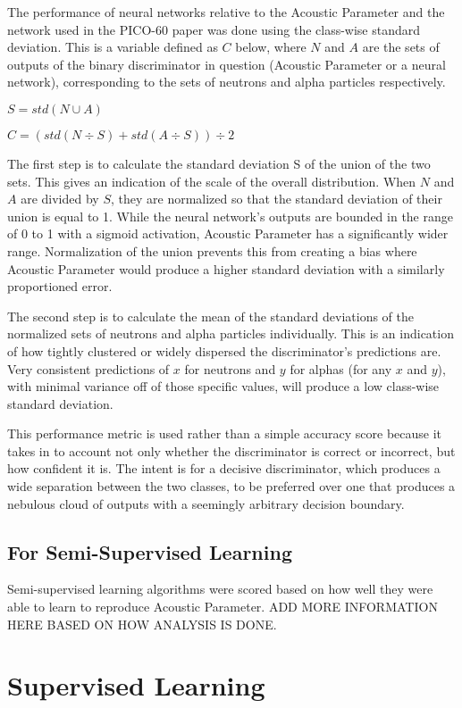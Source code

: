 \documentclass[10pt]{article}
\begin{document}
The performance of neural networks relative to the Acoustic Parameter and the network used in the PICO-60 paper was done using the class-wise standard deviation. This is a variable defined as $C$ below, where $N$ and $A$ are the sets of outputs of the binary discriminator in question (Acoustic Parameter or a neural network), corresponding to the sets of neutrons and alpha particles respectively.

$S=std(N \cup A)$

$C=(std(N \div S) + std(A \div S)) \div 2$

The first step is to calculate the standard deviation S of the union of the two sets. This gives an indication of the scale of the overall distribution. When $N$ and $A$ are divided by $S$, they are normalized so that the standard deviation of their union is equal to 1. While the neural network’s outputs are bounded in the range of 0 to 1 with a sigmoid activation, Acoustic Parameter has a significantly wider range. Normalization of the union prevents this from creating a bias where Acoustic Parameter would produce a higher standard deviation with a similarly proportioned error.

The second step is to calculate the mean of the standard deviations of the normalized sets of neutrons and alpha particles individually. This is an indication of how tightly clustered or widely dispersed the discriminator’s predictions are. Very consistent predictions of $x$ for neutrons and $y$ for alphas (for any $x$ and $y$), with minimal variance off of those specific values, will produce a low class-wise standard deviation.

This performance metric is used rather than a simple accuracy score because it takes in to account not only whether the discriminator is correct or incorrect, but how confident it is. The intent is for a decisive discriminator, which produces a wide separation between the two classes, to be preferred over one that produces a nebulous cloud of outputs with a seemingly arbitrary decision boundary.

\subsection{For Semi-Supervised Learning}

Semi-supervised learning algorithms were scored based on how well they were able to learn to reproduce Acoustic Parameter. ADD MORE INFORMATION HERE BASED ON HOW ANALYSIS IS DONE.

\section{Supervised Learning}
\end{document}
